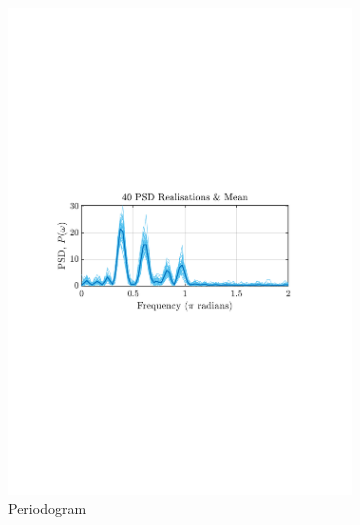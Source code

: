 \documentclass[12pt]{article}
\begin{document}
	\begin{figure}[H]
		\centering
		\begin{subfigure}{0.49\textwidth}
			\centering
			\includegraphics[trim={2.2cm 11.2cm 3.15cm  11.2cm}, clip, width=\textwidth]{../MATLAB/figures/q1_3b_fig01.pdf} 
			\captionsetup{justification=centering}
			\caption{Periodogram}
		\end{subfigure}
		\begin{subfigure}{0.49\textwidth}
			\centering

\end{subfigure}
\end{figure}
\end{document}
